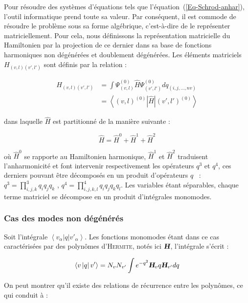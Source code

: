 \documentclass[12pt,a4paper]{book}
\begin{document}
Pour résoudre des systèmes d'équations tels que l'équation~(\ref{Eq-Schrod-anhar}), l'outil informatique prend toute sa valeur. Par conséquent, il est commode de résoudre le problème sous sa forme algébrique, c'est-à-dire de le représenter matriciellement. Pour cela, nous définissons la représentation matricielle du Hamiltonien par la projection de ce dernier dans sa base de fonctions harmoniques non dégénérées et doublement dégénérées. Les éléments matriciels $H_{(v,l)(v',l')}$ sont définis par la relation :

\begin{align}
H_{(v,l)(v',l')} &= \int \Psi^{(0)}_{(v,l)} \hat{H} \Psi^{(0)}_{(v',l')}dq_{(i,j,\ldots ,nv)} \\
&= \left\langle (v,l)^{(0)}\right| \hat{H} \left| (v',l')^{(0)} \right\rangle 
\end{align}

\noindent dans laquelle $\hat{H}$ est partitionné de la manière suivante : 

\begin{equation}
\hat{H} = \hat{H}^0 + \hat{H}^1 + \hat{H}^2 
\end{equation}

\noindent où $\hat{H}^0$ se rapporte au Hamiltonien harmonique, $\hat{H}^1$ et $\hat{H}^2$ traduisent l'anharmonicité et font intervenir respectivement les opérateurs $q^3$ et $q^4$, ces derniers pouvant être décomposés en un produit d'opérateurs $q$~\cite{barchewitz1961spectroscopie} : $q^3 = \displaystyle{\prod^3_{i,j,k}q_iq_jq_k}$ , $q^4 = \displaystyle{\prod^4_{i,j,k,l}q_iq_jq_kq_l}$.
Les variables étant séparables, chaque terme matriciel se décompose en un produit d'intégrales monomodes.

\subsubsection*{Cas des modes non dégénérés}

Soit l'intégrale $\left\langle v_{\alpha}\left|q \right|v'_{\alpha} \right\rangle$. Les fonctions monomodes étant dans ce cas caractérisées par des polynômes d'\textsc{Hermite}, notés ici $\textsl{\textbf{H}}$, l'intégrale s'écrit :

\begin{equation}
\left\langle v \left|q \right|v' \right\rangle = N_v N_{v'} \int e^{-q^2} \textsl{\textbf{H}}_v q \textsl{\textbf{H}}_{v'} dq
\end{equation}

On peut montrer qu'il existe des relations de récurrence entre les polynômes, ce qui conduit à \cite{wilson1955molecular} :
\end{document}
